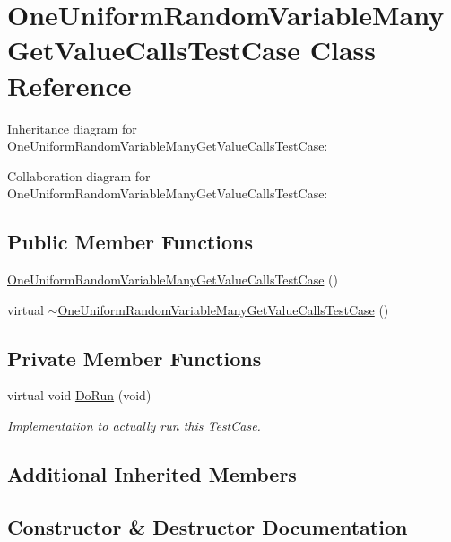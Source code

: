 \hypertarget{classOneUniformRandomVariableManyGetValueCallsTestCase}{}\section{One\+Uniform\+Random\+Variable\+Many\+Get\+Value\+Calls\+Test\+Case Class Reference}
\label{classOneUniformRandomVariableManyGetValueCallsTestCase}


Inheritance diagram for One\+Uniform\+Random\+Variable\+Many\+Get\+Value\+Calls\+Test\+Case\+:


Collaboration diagram for One\+Uniform\+Random\+Variable\+Many\+Get\+Value\+Calls\+Test\+Case\+:
\subsection*{Public Member Functions}
\begin{DoxyCompactItemize}
\item 
\hyperlink{classOneUniformRandomVariableManyGetValueCallsTestCase_a6a968cb9d13233958b09e961fc7a7271}{One\+Uniform\+Random\+Variable\+Many\+Get\+Value\+Calls\+Test\+Case} ()
\item 
virtual \hyperlink{classOneUniformRandomVariableManyGetValueCallsTestCase_ac7c3caf3b9a5c144b64ed55bf692e94d}{$\sim$\+One\+Uniform\+Random\+Variable\+Many\+Get\+Value\+Calls\+Test\+Case} ()
\end{DoxyCompactItemize}
\subsection*{Private Member Functions}
\begin{DoxyCompactItemize}
\item 
virtual void \hyperlink{classOneUniformRandomVariableManyGetValueCallsTestCase_aa51b2a9ca377c494f8f0595b56bbe56f}{Do\+Run} (void)
\begin{DoxyCompactList}\small\item\em Implementation to actually run this Test\+Case. \end{DoxyCompactList}\end{DoxyCompactItemize}
\subsection*{Additional Inherited Members}


\subsection{Constructor \& Destructor Documentation}
